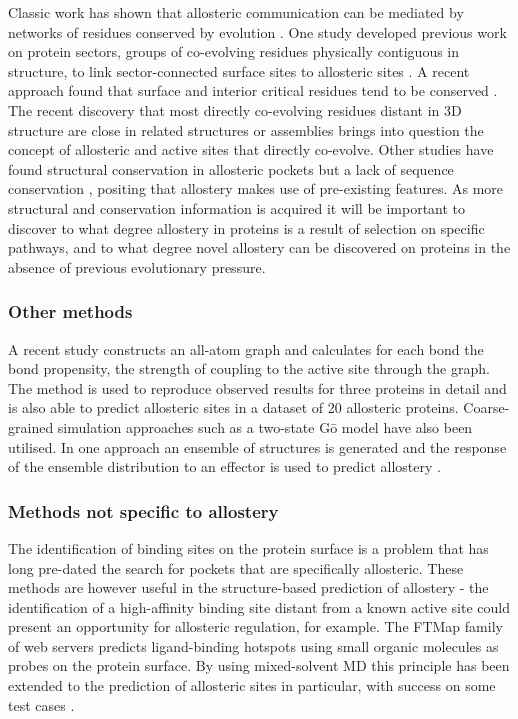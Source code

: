 Classic work has shown that allosteric communication can be mediated by networks of residues conserved by evolution \cite{Lockless1999, Suel2003}.
One study developed previous work on protein sectors, groups of co-evolving residues physically contiguous in structure, to link sector-connected surface sites to allosteric sites \cite{Reynolds2011}.
A recent approach found that surface and interior critical residues tend to be conserved \cite{Clarke2016}.
The recent discovery that most directly co-evolving residues distant in 3D structure are close in related structures or assemblies \cite{Anishchenko2017} brings into question the concept of allosteric and active sites that directly co-evolve.
Other studies have found structural conservation in allosteric pockets but a lack of sequence conservation \cite{Panjkovich2010, Panjkovich2013}, positing that allostery makes use of pre-existing features.
As more structural and conservation information is acquired it will be important to discover to what degree allostery in proteins is a result of selection on specific pathways, and to what degree novel allostery can be discovered on proteins in the absence of previous evolutionary pressure.


\subsubsection{Other methods}

A recent study \cite{Amor2016} constructs an all-atom graph and calculates for each bond the bond propensity, the strength of coupling to the active site through the graph.
The method is used to reproduce observed results for three proteins in detail and is also able to predict allosteric sites in a dataset of 20 allosteric proteins.
Coarse-grained simulation approaches such as a two-state G\={o} model have also been utilised.
In one approach an ensemble of structures is generated and the response of the ensemble distribution to an effector is used to predict allostery \cite{Qi2012}.


\subsubsection{Methods not specific to allostery}

The identification of binding sites on the protein surface is a problem that has long pre-dated the search for pockets that are specifically allosteric.
These methods are however useful in the structure-based prediction of allostery - the identification of a high-affinity binding site distant from a known active site could present an opportunity for allosteric regulation, for example.
The FTMap family of web servers \cite{Kozakov2015} predicts ligand-binding hotspots using small organic molecules as probes on the protein surface.
By using mixed-solvent MD this principle has been extended to the prediction of allosteric sites in particular, with success on some test cases \cite{Ghanakota2016}.

